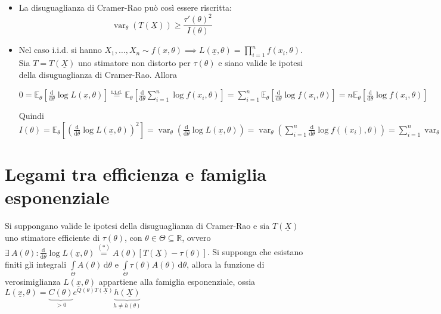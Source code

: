 \documentclass[hidelinks, 10pt]{report}
\DeclareMathOperator{\var}{var}
\begin{document}
\begin{oss}
\noindent
\begin{itemize}
\item La disuguaglianza di Cramer-Rao pu\`o cos\`i essere riscritta:
\[ \var_{\theta} (T(\underline{X})) \ge \frac{\tau'(\theta)^2}{I(\theta)} \]
\item Nel caso i.i.d. si hanno $ X_1, \dotsc, X_n \sim f(x, \theta) \implies L(\underline{x}, \theta) = \prod\limits_{i = 1}^{n} f(x_i, \theta) $. Sia $ T = T(\underline{X}) $ uno stimatore non distorto per $ \tau(\theta) $ e siano valide le ipotesi della disuguaglianza di Cramer-Rao. Allora

$ 0 = \mathbb{E}_{\theta} \left[ \frac{\mathrm{d}}{\mathrm{d} \theta} \log L(\underline{x}, \theta) \right] \stackrel{\text{i.i.d.}}{=} \mathbb{E}_{\theta} \left[ \frac{\mathrm{d}}{\mathrm{d} \theta} \sum\limits_{i = 1}^{n} \log f(x_i, \theta) \right] = \sum\limits_{i = 1}^{n} \mathbb{E}_{\theta} \left[ \frac{\mathrm{d}}{\mathrm{d} \theta} \log f(x_i, \theta) \right] = n \mathbb{E}_{\theta} \left[ \frac{\mathrm{d}}{\mathrm{d} \theta} \log f(x_i, \theta) \right] $

Quindi $ I(\theta) = \mathbb{E}_{\theta} \left[ \left( \frac{\mathrm{d}}{\mathrm{d} \theta} \log L(\underline{x}, \theta) \right)^2 \right] = \var_{\theta} \left( \frac{\mathrm{d}}{\mathrm{d} \theta} \log L(\underline{x}, \theta) \right) = \var_{\theta} \left( \sum\limits_{i = 1}^{n} \frac{\mathrm{d}}{\mathrm{d} \theta} \log f((x_i), \theta) \right) = \sum\limits_{i = 1}^{n} \var_{\theta} \left( \frac{\mathrm{d}}{\mathrm{d} \theta} \log f((x_i), \theta) \right) \stackrel{\text{i.i.d.}}{=} n \var_{\theta} \left( \frac{\mathrm{d}}{\mathrm{d} \theta} \log f((x_i), \theta) \right) = n \mathbb{E}_{\theta} \left[ \left( \frac{\mathrm{d}}{\mathrm{d} \theta} \log f((x_i), \theta) \right)^2 \right] \eqdef n \tilde{I}(\theta) $
\end{itemize}
\end{oss}

\section{Legami tra efficienza e famiglia esponenziale}
\begin{prop}
Si suppongano valide le ipotesi della disuguaglianza di Cramer-Rao e sia $ T(\underline{X}) $ uno stimatore efficiente di $ \tau(\theta) $, con $ \theta \in \Theta \subseteq \mathbb{R} $, ovvero $ \exists\ A(\theta) : \frac{\mathrm{d}}{\mathrm{d} \theta} \log L(\underline{x}, \theta) \stackrel{(\ast)}{=} A(\theta) [T(\underline{X}) - \tau(\theta)] $. Si supponga che esistano finiti gli integrali $ \int\limits_{\Theta} A(\theta) \, \mathrm{d}\theta $ e $ \int\limits_{\Theta} \tau(\theta) A(\theta) \, \mathrm{d}\theta $, allora la funzione di verosimiglianza $ L (\underline{x}, \theta) $ appartiene alla famiglia esponenziale, ossia $ L(\underline{x}, \theta) = \underbrace{C(\theta)}_{> 0} e^{Q(\theta) T(\underline{X})} \underbrace{h(\underline{X})}_{h \ne h(\theta)} $ 
\end{prop}
\end{document}
